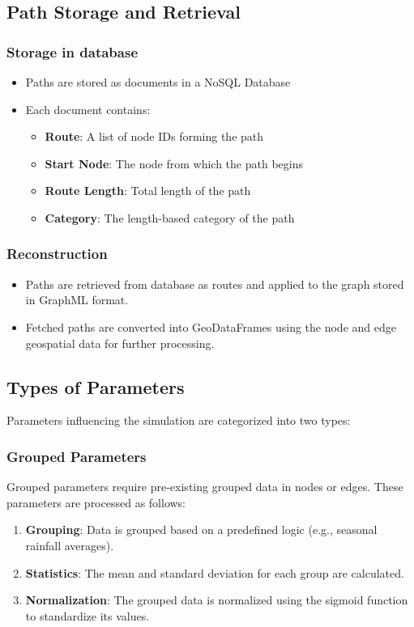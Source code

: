 \documentclass[sigplan,screen]{acmart}
\begin{document}
\subsection{Path Storage and Retrieval}
\subsubsection{Storage in database}
\begin{itemize}
    \item Paths are stored as documents in a NoSQL Database
    \item Each document contains:
    \begin{itemize}
        \item \textbf{Route}: A list of node IDs forming the path
        \item \textbf{Start Node}: The node from which the path begins
        \item \textbf{Route Length}: Total length of the path
        \item \textbf{Category}: The length-based category of the path
    \end{itemize}
\end{itemize}

\subsubsection{Reconstruction}
\begin{itemize}
    \item Paths are retrieved from database as routes and applied to the graph stored in GraphML format.
    \item Fetched paths are converted into GeoDataFrames using the node and edge geospatial data for further processing.
\end{itemize}

\subsection{Types of Parameters}
Parameters influencing the simulation are categorized into two types:

\subsubsection{Grouped Parameters}
Grouped parameters require pre-existing grouped data in nodes or edges. These parameters are processed as follows:

\begin{enumerate}
    \item \textbf{Grouping}: Data is grouped based on a predefined logic (e.g., seasonal rainfall averages).
    \item \textbf{Statistics}: The mean and standard deviation for each group are calculated.
    \item \textbf{Normalization}: The grouped data is normalized using the sigmoid function to standardize its values.
\end{enumerate}
\end{document}
